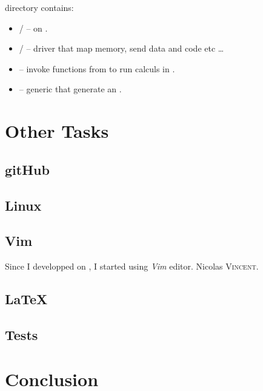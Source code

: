  directory contains:
\begin{itemize}
	\item {}/ --  on \vc.
	\item {}/ --  driver that map memory, send data and code etc \ldots
	\item {} -- invoke functions from  to run calculs in \vc.
	\item {} -- generic  that generate an .
\end{itemize}

\section{Other Tasks}\label{FillingFile}

\subsection{gitHub}

\subsection{Linux}

\subsection{Vim}

Since I developped on \rasp{}, I started using \emph{Vim} editor. Nicolas \textsc{Vincent}.

\subsection{\LaTeX}

\subsection{Tests}


\section{Conclusion}\label{Conclusion2}

